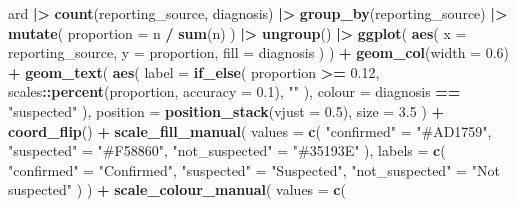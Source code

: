 \documentclass[
  british,
]{article}
\newenvironment{Shaded}{\begin{snugshade}}{\end{snugshade}}
\newcommand{\AttributeTok}[1]{\textcolor[rgb]{0.13,0.29,0.53}{#1}}
\newcommand{\FloatTok}[1]{\textcolor[rgb]{0.00,0.00,0.81}{#1}}
\newcommand{\FunctionTok}[1]{\textcolor[rgb]{0.13,0.29,0.53}{\textbf{#1}}}
\newcommand{\NormalTok}[1]{#1}
\newcommand{\OtherTok}[1]{\textcolor[rgb]{0.56,0.35,0.01}{#1}}
\newcommand{\SpecialCharTok}[1]{\textcolor[rgb]{0.81,0.36,0.00}{\textbf{#1}}}
\newcommand{\StringTok}[1]{\textcolor[rgb]{0.31,0.60,0.02}{#1}}
\begin{document}
\begin{Shaded}
\begin{Highlighting}[]
\NormalTok{ard }\SpecialCharTok{|\textgreater{}}
  \FunctionTok{count}\NormalTok{(reporting\_source, diagnosis) }\SpecialCharTok{|\textgreater{}}
  \FunctionTok{group\_by}\NormalTok{(reporting\_source) }\SpecialCharTok{|\textgreater{}}
  \FunctionTok{mutate}\NormalTok{(}
    \AttributeTok{proportion =}\NormalTok{ n }\SpecialCharTok{/} \FunctionTok{sum}\NormalTok{(n)}
\NormalTok{  ) }\SpecialCharTok{|\textgreater{}}
  \FunctionTok{ungroup}\NormalTok{() }\SpecialCharTok{|\textgreater{}}
  \FunctionTok{ggplot}\NormalTok{(}
    \FunctionTok{aes}\NormalTok{(}
      \AttributeTok{x =}\NormalTok{ reporting\_source,}
      \AttributeTok{y =}\NormalTok{ proportion,}
      \AttributeTok{fill =}\NormalTok{ diagnosis}
\NormalTok{    )}
\NormalTok{  ) }\SpecialCharTok{+}
  \FunctionTok{geom\_col}\NormalTok{(}\AttributeTok{width =} \FloatTok{0.6}\NormalTok{) }\SpecialCharTok{+}
  \FunctionTok{geom\_text}\NormalTok{(}
    \FunctionTok{aes}\NormalTok{(}
      \AttributeTok{label =} \FunctionTok{if\_else}\NormalTok{(}
\NormalTok{        proportion }\SpecialCharTok{\textgreater{}=} \FloatTok{0.12}\NormalTok{,}
\NormalTok{        scales}\SpecialCharTok{::}\FunctionTok{percent}\NormalTok{(proportion, }\AttributeTok{accuracy =} \FloatTok{0.1}\NormalTok{),}
        \StringTok{""}
\NormalTok{      ),}
      \AttributeTok{colour =}\NormalTok{ diagnosis }\SpecialCharTok{==} \StringTok{"suspected"}
\NormalTok{    ),}
    \AttributeTok{position =} \FunctionTok{position\_stack}\NormalTok{(}\AttributeTok{vjust =} \FloatTok{0.5}\NormalTok{),}
    \AttributeTok{size =} \FloatTok{3.5}
\NormalTok{  ) }\SpecialCharTok{+}
  \FunctionTok{coord\_flip}\NormalTok{() }\SpecialCharTok{+}
  \FunctionTok{scale\_fill\_manual}\NormalTok{(}
    \AttributeTok{values =} \FunctionTok{c}\NormalTok{(}
      \StringTok{"confirmed"} \OtherTok{=} \StringTok{"\#AD1759"}\NormalTok{,}
      \StringTok{"suspected"} \OtherTok{=} \StringTok{"\#F58860"}\NormalTok{,}
      \StringTok{"not\_suspected"} \OtherTok{=} \StringTok{"\#35193E"}
\NormalTok{    ),}
    \AttributeTok{labels =} \FunctionTok{c}\NormalTok{(}
      \StringTok{"confirmed"} \OtherTok{=} \StringTok{"Confirmed"}\NormalTok{,}
      \StringTok{"suspected"} \OtherTok{=} \StringTok{"Suspected"}\NormalTok{,}
      \StringTok{"not\_suspected"} \OtherTok{=} \StringTok{"Not suspected"}
\NormalTok{    )}
\NormalTok{  ) }\SpecialCharTok{+}
  \FunctionTok{scale\_colour\_manual}\NormalTok{(}
    \AttributeTok{values =} \FunctionTok{c}\NormalTok{(}

\end{Highlighting}
\end{Shaded}
\end{document}
